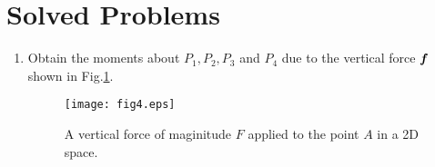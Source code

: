\documentclass[10pt,a4j]{article}
\begin{document}
\section{Solved Problems}
\begin{enumerate}
\item
	Obtain the moments about $P_1,P_2,P_3$ and $P_4$ due to the vertical
	force $\mbox{\boldmath $f$}$ shown in Fig.\ref{fig:fig4}.
	\begin{figure}[h]
		\begin{center}
		\texttt{[image: fig4.eps]} 
		\end{center}
		\caption{A vertical force of maginitude $F$ applied to the point $A$ in 
		a 2D space.} 
		\label{fig:fig4}
	\end{figure}
	\\


\end{enumerate}
\end{document}
